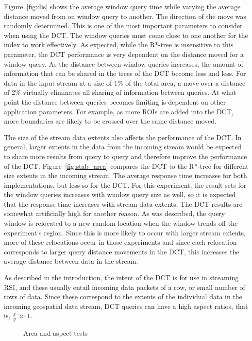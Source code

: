 \documentclass{ucdthesis}       %
\begin{document}
Figure~\ref{fig:dis} shows the average window query time while varying
the average distance moved from on window query to another.  The
direction of the move was randomly determined.  This is one of the
most important parameters to consider when using the \ac{DCT}.  The window
queries must come close to one another for the index to work
effectively.  As expected, while the R*-tree is insensitive to this
parameter, the \ac{DCT} performance is very dependent on the distance
moved for a window query.  As the distance between window queries
increases, the amount of information that can be shared in the trees
of the \ac{DCT} become less and less.  For data in the input stream at a
size of 1\% of the total area, a move over a distance of 2\% virtually
eliminates all sharing of information between queries.  At what point
the distance between queries becomes limiting is dependent on other
application parameters.  For example, as more \acp{ROI} are added into
the \ac{DCT}, more boundaries are likely to be crossed over the same
distance moved.


The size of the stream data extents also affects the performance of
the \ac{DCT}.  In general, larger extents in the data from the incoming
stream would be expected to share more results from query to query and
therefore improve the performance of the \ac{DCT}.
Figure~\ref{fig:stab_area} compares the \ac{DCT} to the R*-tree for
different size extents in the incoming stream.  The average response
time increases for both implementations, but less so for the \ac{DCT}.
For this experiment, the result sets for the window queries increases
with window query size as well, so it is expected that the response
time increases with stream data extents.  The \ac{DCT} results are somewhat
artificially high for another reason.  As was described, the query
window is relocated to a new random location when the window trends
off the experiment's region.  Since this is more likely to occur with
larger stream extents, more of these relocations occur in those
experiments and since each relocation corresponds to larger query
distance movements in the \ac{DCT}, this increases the average distance
between data in the stream.

As described in the introduction, the intent of the \ac{DCT} is for use
in streaming \ac{RSI}, and these usually entail incoming data packets
of a row, or small number of rows of data.  Since these correspond to
the extents of the individual data in the incoming geospatial data
stream, \ac{DCT} queries can have a high aspect ratios, that is,
$\frac{x}{y} \gg 1$.
%
\begin{figure}[htb]
  \caption{Area and aspect tests}
\end{figure}
\end{document}
